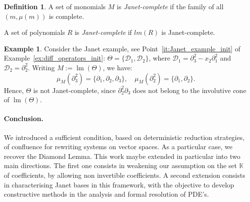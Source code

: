\documentclass[10pt]{easychair}
\theoremstyle{definition}
\newtheorem{definition}[theorem]{Definition}
\newtheorem{example}[theorem]{Example}
\newcommand\D{\mathcal{D}}
\DeclareMathOperator{\lm}{lm}
\newcommand\K{\mathbb{K}}
\begin{document}
 \begin{definition}
   A set of monomials $M$ is \emph{Janet-complete} if the family of
   all $(m,\mu(m))$ is complete.

   A set of polynomials $R$ is \emph{Janet-complete} if $lm(R)$ is
   Janet-complete.
 \end{definition}

 
\begin{example}
  Consider the Janet example, see Point~\ref{it:Janet_example_init} of
  Example~\ref{ex:diff_operators_init}: $\Theta=\{\D_1,\D_2\}$, where
  $\D_1=\partial_3^2 -x_2\partial_1^2$ and $\D_2=\partial_2^2$. Writing
  $M:=\lm(\Theta)$, we have:
  \[\mu_M(\partial_3^2)=\{\partial_1,\partial_2,\partial_3\},\quad
  \mu_M(\partial_2^2)=\{\partial_1,\partial_2\}.\]
  Hence, $\Theta$ is not Janet-complete, since $\partial_2^2\partial_3$
  does not belong to the involutive cone of $\lm(\Theta)$.
 \end{example}




 \paragraph{Conclusion.} We introduced a sufficient condition,
 based on deterministic reduction strategies, of confluence for
 rewriting systems on vector spaces. As a particular case,
 we recover the Diamond Lemma. This work maybe extended in particular
 into two main directions. The first one consists in weakening our assumption
 on the set $\K$ of coefficients, by allowing non invertible coefficients.
 A second extension consists in characterising Janet bases in this framework,
 with the objective to develop constructive methods in the analysis and formal
 resolution of PDE's.


\end{document}
